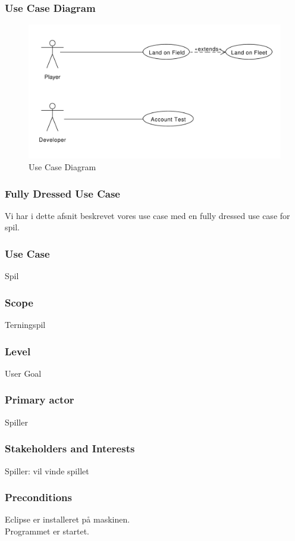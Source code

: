 \subsubsection{Use Case Diagram}
\begin{figure}[ht]
\centering
\includegraphics[width=1\textwidth]{UseCase.pdf}
\caption[<Text for the list of figures>]{Use Case Diagram}
\label{fig:figure 2}
\end{figure}
\newpage
\subsubsection{Fully Dressed Use Case}
Vi har i dette afsnit beskrevet vores use case med en fully dressed use case for spil.
\subsubsection*{Use Case}
Spil
\subsubsection*{Scope}
Terningspil
\subsubsection*{Level}
User Goal
\subsubsection*{Primary actor}
Spiller
\subsubsection*{Stakeholders and Interests}
Spiller: vil vinde spillet
\subsubsection*{Preconditions}
Eclipse er installeret på maskinen.
\\
Programmet er startet.
